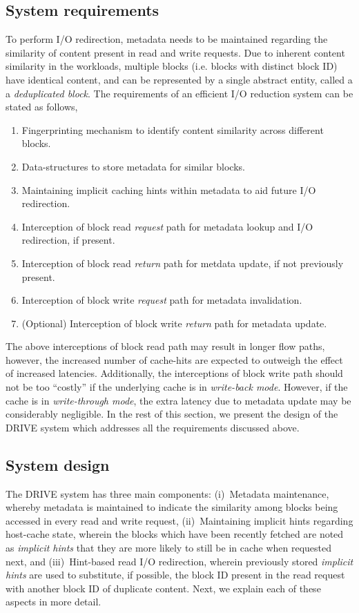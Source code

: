 \subsection{System requirements}
To perform I/O redirection, metadata needs to be maintained
regarding the similarity of content present in read and write requests. 
Due to inherent content similarity in the workloads,
multiple blocks (i.e. blocks with distinct block ID) have identical content,
and can be represented by a single abstract entity, called a 
a \textit{deduplicated block}. The requirements of an efficient 
I/O reduction system can be stated as follows,
\begin{enumerate}
            \item Fingerprinting mechanism to identify content similarity across
                different blocks.
            \item Data-structures to store metadata for similar blocks.
            \item Maintaining implicit caching hints within metadata to aid
                future I/O redirection.
            \item Interception of block read \textit{request} path for 
                metadata lookup and I/O redirection, if present.
            \item Interception of block read \textit{return} path for
                metdata update, if not previously present.
            \item Interception of block write \textit{request} path for 
                metadata invalidation.
            \item (Optional) Interception of block write \textit{return} 
				path for metadata update.
\end{enumerate}
The above interceptions of block read path may result in longer flow paths,
however, the increased number of cache-hits are expected to outweigh
the effect of increased latencies.
Additionally, the interceptions of block write path should not be too ``costly''
if the underlying cache is in \textit{write-back mode}. However, 
if the cache is in \textit{write-through mode}, the extra latency
due to metadata update may be considerably negligible. 
In the rest of this section, we present the design of the DRIVE system
which addresses all the requirements discussed above.

\subsection{System design}
The DRIVE system has three main components: (i)~Metadata maintenance,
whereby metadata 
is maintained to indicate the similarity among blocks being 
accessed in every read and write request, 
(ii)~Maintaining implicit hints regarding host-cache state, wherein the 
blocks which have been recently fetched are noted as \textit{implicit hints} 
that they are more likely to still be in cache when requested next, and
(iii)~Hint-based read I/O redirection, wherein previously stored 
\textit{implicit hints} are used to substitute, if possible, the block 
ID present in the read request with another block ID of duplicate content.
Next, we explain each of these aspects in more detail.

